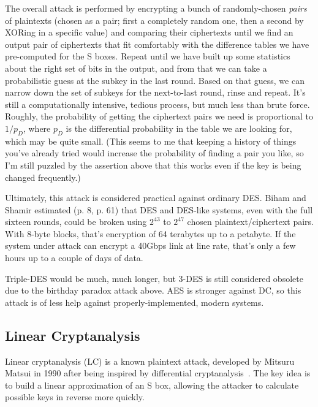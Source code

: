 The overall attack is performed by encrypting a bunch of
randomly-chosen \emph{pairs} of plaintexts (chosen as a pair; first a
completely random one, then a second by XORing in a specific value)
and comparing their ciphertexts until we find an output pair of
ciphertexts that fit comfortably with the difference tables we have
pre-computed for the S boxes.  Repeat until we have built up some
statistics about the right set of bits in the output, and from that we
can take a probabilistic guess at the subkey in the last round.  Based
on that guess, we can narrow down the set of subkeys for the
next-to-last round, rinse and repeat.  It's still a computationally
intensive, tedious process, but much less than brute force.  Roughly,
the probability of getting the ciphertext pairs we need is
proportional to $1/p_D$,  where $p_D$ is the differential probability
in the table we are looking for, which may be quite small.  (This
seems to me that keeping a history of things you've already tried
would increase the probability of finding a pair you like, so I'm
still puzzled by the assertion above that this works even if the key
is being changed frequently.) \aonolook{}

Ultimately, this attack is considered practical against ordinary DES.
Biham and Shamir estimated (p. 8, p. 61) that DES and DES-like
systems, even with the full sixteen rounds, could be broken using
$2^{43}$ to $2^{47}$ chosen plaintext/ciphertext pairs.  With 8-byte
blocks, that's encryption of 64 terabytes up to a petabyte.  If the
system under attack can encrypt a 40Gbps link at line rate, that's
only a few hours up to a couple of days of data.

Triple-DES would be much, much longer, but 3-DES is still considered
obsolete due to the birthday paradox attack above.  AES is stronger
against DC, so this attack is of less help against
properly-implemented, modern systems.

\aonolook{}

\subsection{Linear Cryptanalysis}

Linear cryptanalysis (LC) is a known plaintext attack, developed by
Mitsuru Matsui in 1990 after being inspired by differential
cryptanalysis~\cite{matsui1993linear,heys:tutorial}.  The key idea is
to build a linear approximation of an S box, allowing the attacker to
calculate possible keys in reverse more quickly.

